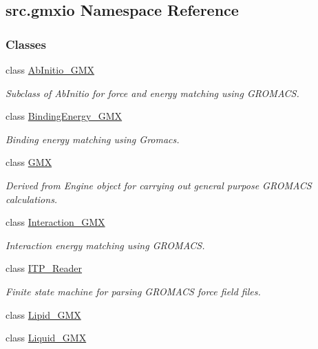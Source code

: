 \hypertarget{namespacesrc_1_1gmxio}{}\subsection{src.\+gmxio Namespace Reference}
\label{namespacesrc_1_1gmxio}
\subsubsection*{Classes}
\begin{DoxyCompactItemize}
\item 
class \hyperlink{classsrc_1_1gmxio_1_1AbInitio__GMX}{Ab\+Initio\+\_\+\+G\+MX}
\begin{DoxyCompactList}\small\item\em Subclass of Ab\+Initio for force and energy matching using G\+R\+O\+M\+A\+CS. \end{DoxyCompactList}\item 
class \hyperlink{classsrc_1_1gmxio_1_1BindingEnergy__GMX}{Binding\+Energy\+\_\+\+G\+MX}
\begin{DoxyCompactList}\small\item\em Binding energy matching using Gromacs. \end{DoxyCompactList}\item 
class \hyperlink{classsrc_1_1gmxio_1_1GMX}{G\+MX}
\begin{DoxyCompactList}\small\item\em Derived from Engine object for carrying out general purpose G\+R\+O\+M\+A\+CS calculations. \end{DoxyCompactList}\item 
class \hyperlink{classsrc_1_1gmxio_1_1Interaction__GMX}{Interaction\+\_\+\+G\+MX}
\begin{DoxyCompactList}\small\item\em Interaction energy matching using G\+R\+O\+M\+A\+CS. \end{DoxyCompactList}\item 
class \hyperlink{classsrc_1_1gmxio_1_1ITP__Reader}{I\+T\+P\+\_\+\+Reader}
\begin{DoxyCompactList}\small\item\em Finite state machine for parsing G\+R\+O\+M\+A\+CS force field files. \end{DoxyCompactList}\item 
class \hyperlink{classsrc_1_1gmxio_1_1Lipid__GMX}{Lipid\+\_\+\+G\+MX}
\item 
class \hyperlink{classsrc_1_1gmxio_1_1Liquid__GMX}{Liquid\+\_\+\+G\+MX}

\end{DoxyCompactItemize}

